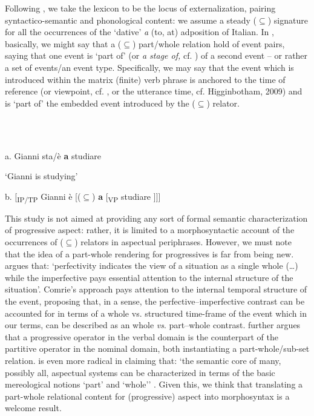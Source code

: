 \documentclass[output=paper,colorlinks,citecolor=brown]{./langscibook}
\begin{document}
Following \citet{BerwickChomsky2011}, we take the lexicon to be the locus of externalization, pairing syntactico-semantic and phonological content: we assume a steady (${\subseteq}$) signature for all the occurrences of the ‘dative’ \textit{a} (to, at) adposition of Italian. In , basically, we might say that a (${\subseteq}$) part/whole relation hold of event pairs, saying that one event is ‘part of’ (or \textit{a stage of,} cf. \citealt{Landman1992}) of a second event – or rather a set of events/an event type. Specifically, we may say that the event which is introduced within the matrix (finite) verb phrase is anchored to the time of reference (or viewpoint, cf. \citealt{Comrie1976}, or the utterance time, cf. Higginbotham, 2009) and is ‘part of’ the embedded event introduced by the (${\subseteq}$) relator. 

\ea%
    \label{ex:key:8}
    \gll\\
        \\
    \glt
    \z

           a.  Gianni sta/è \textbf{a} studiare

‘Gianni is studying’

b.  [\textsubscript{IP/TP} Gianni è [(${\subseteq}$) \textbf{a} [\textsubscript{VP} studiare ]]]

This study is not aimed at providing any sort of formal semantic characterization of progressive aspect: rather, it is limited to a morphosyntactic account of the occurrences of (${\subseteq}$) relators in aspectual periphrases. However, we must note that the idea of a part-whole rendering for progressives is far from being new. \citet[16]{Comrie1976} argues that: ‘perfectivity indicates the view of a situation as a single whole (…) while the imperfective pays essential attention to the internal structure of the situation’. Comrie’s approach pays attention to the internal temporal structure of the event, proposing that, in a sense, the perfective–imperfective contrast can be accounted for in terms of a  whole vs. structured time-frame of the event which in our terms, can be described as an whole \textit{vs}. part–whole contrast. \citet{Bach1986} further argues that a progressive operator in the verbal domain is the counterpart of the partitive operator in the nominal domain, both instantiating a part-whole/sub-set relation. \citet{Filip1999} is even more radical in claiming that: ‘the semantic core of many, possibly all, aspectual systems can be characterized in terms of the basic mereological notions ‘part’ and ‘whole’’ \citep[158]{Filip1999}. Given this, we think that translating a part-whole relational content for (progressive) aspect into morphosyntax is a welcome result.  
\end{document}

